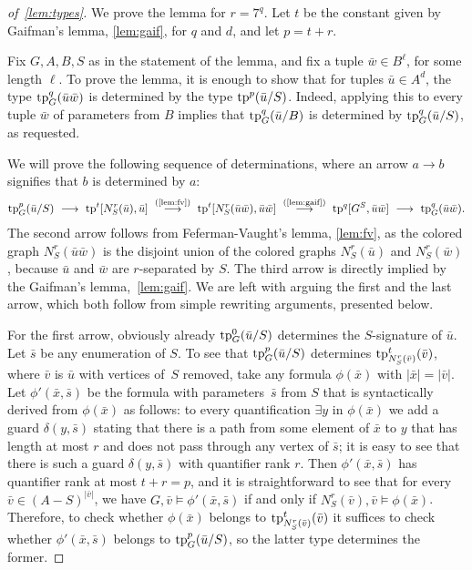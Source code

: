 \begin{proof}[of~\cref{lem:types}]
We prove the lemma for $r=7^q$.
Let $t$ be the constant given by Gaifman's lemma, \cref{lem:gaif}, for $q$ and $d$, and let $p=t+r$.

Fix $G,A,B,S$ as in the statement of the lemma, and fix a tuple $\bar w\in B^\ell$, for some length $\ell$.
To prove the lemma, it is enough to show that
for tuples $\bar u\in A^d$,
the type $\mathrm{tp}^q_G(\bar u\bar w)$ is determined by the type $\mathrm{tp}^p(\bar u/S)$.
Indeed, applying this to every tuple $\bar w$ of parameters from $B$ implies that $\mathrm{tp}^q_G(\bar u/B)$ is determined by $\mathrm{tp}^q_G(\bar u/S)$, as requested.

We will prove the following sequence of determinations,
where an arrow $a\rightarrow b$ signifies that $b$ is determined by $a$:
\begin{align*}
	\tp^p_G(\bar u/S)
  \ \longrightarrow\ 
	\tp^{t}[N^r_S(\bar u), \bar u]
  \ \stackrel{\textrm{(\ref{lem:fv})}}{\longrightarrow}\ 
	\tp^{t}[N^r_S(\bar u\bar w), \bar u\bar w] \ \stackrel{\textrm{(\ref{lem:gaif})}}\longrightarrow\ 
	\tp^q[G^S, \bar u\bar w] \ \longrightarrow\ 
	\tp^q_G(\bar u\bar w).
\end{align*}
The second arrow follows from Feferman-Vaught's lemma, \cref{lem:fv},
as the colored graph $N^r_S(\bar u\bar w)$
is the disjoint union of the colored graphs 
$N^r_S(\bar u)$ and $N^r_S(\bar w)$,
because $\bar u$ and $\bar w$ are $r$-separated by $S$.
The third arrow is directly implied by the Gaifman's lemma,~\cref{lem:gaif}.
We are left with arguing the first and the last arrow, which both follow from simple rewriting arguments, presented below.

\medskip
For the first arrow, obviously already $\mathrm{tp}^0_G(\bar u/S)$ determines the $S$-signature of $\bar u$. Let $\bar s$ be any enumeration of $S$.
To see that $\mathrm{tp}^p_G(\bar u/S)$ determines $\mathrm{tp}^{t}_{N^r_S(\bar v)}(\bar v)$, where $\bar v$ is $\bar u$ with vertices of~$S$ removed, take any formula $\phi(\bar x)$ with $|\bar x|=|\bar v|$.
Let $\phi'(\bar x,\bar s)$ be the formula with parameters~$\bar s$ from $S$ that is syntactically derived from $\phi(\bar x)$ as follows: 
to every quantification $\exists y$ in $\phi(\bar x)$ we add a guard $\delta(y,\bar s)$ stating that there is a path from some element of $\bar x$ to $y$ that has length at most $r$ and does not pass through
any vertex of $\bar s$; it is easy to see that there is such a guard $\delta(y,\bar s)$ with quantifier rank $r$.
Then $\phi'(\bar x,\bar s)$ has quantifier rank at most $t+r=p$, and it is straightforward to see that for every $\bar v\in (A-S)^{|\bar v|}$, we have $G,\bar v\models \phi'(\bar x,\bar s)$ if and only if
$N^r_S(\bar v),\bar v\models \phi(\bar x)$. Therefore, to check whether $\phi(\bar x)$ belongs to $\mathrm{tp}^{t}_{N^r_S(\bar v)}(\bar v)$ it suffices to check 
whether $\phi'(\bar x,\bar s)$ belongs to $\mathrm{tp}^p_G(\bar u/S)$, so the latter type determines the former.


\end{proof}
